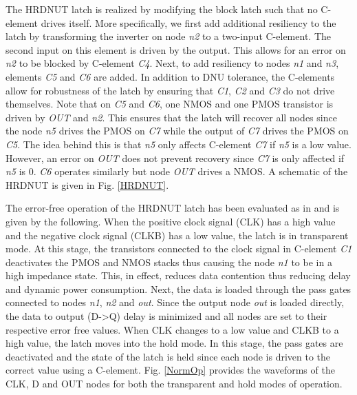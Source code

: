 The HRDNUT latch is realized by modifying the block latch such that no C-element drives itself. More specifically, we first add additional resiliency to the latch by transforming the inverter on node \textit{n2} to a two-input C-element. The second input on this element is driven by the output. This allows for an error on \textit{n2} to be blocked by C-element \textit{C4}. Next, to add resiliency to nodes \textit{n1} and \textit{n3}, elements \textit{C5} and \textit{C6} are added. In addition to DNU tolerance, the C-elements allow for robustness of the latch by ensuring that \textit{C1}, \textit{C2} and \textit{C3} do not drive themselves. Note that on \textit{C5} and \textit{C6}, one NMOS and one PMOS transistor is driven by \textit{OUT} and \textit{n2}. This ensures that the latch will recover all nodes since the node \textit{n5} drives the PMOS on \textit{C7} while the output of \textit{C7} drives the PMOS  on \textit{C5}. The idea behind this is that \textit{n5} only affects C-element \textit{C7} if \textit{n5} is a low value. However, an error on \textit{OUT} does not prevent recovery since \textit{C7} is only affected if \textit{n5} is 0. \textit{C6} operates similarly but node \textit{OUT} drives a NMOS. A schematic of the HRDNUT is given in Fig. \ref{HRDNUT}.

The error-free operation of the HRDNUT latch has been evaluated as in \cite{Watkins2016} and is given by the following. When the positive clock signal (CLK) has a high value and the negative clock signal (CLKB) has a low value, the latch is in transparent mode. At this stage, the transistors connected to the clock signal in C-element \textit{C1} deactivates the PMOS and NMOS stacks thus causing the node \textit{n1} to be in a high impedance state. This, in effect, reduces data contention thus reducing delay and dynamic power consumption. Next, the data is loaded through the pass gates connected to nodes \textit{n1}, \textit{n2} and \textit{out}. Since the output node \textit{out} is loaded directly, the data to output (D-\textgreater Q) delay is minimized and all nodes are set to their respective error free values. When CLK changes to a low value and CLKB to a high value, the latch moves into the hold mode. In this stage, the pass gates are deactivated and the state of the latch is held since each node is driven to the correct value using a C-element. Fig. \ref{NormOp} provides the waveforms of the CLK, D and OUT nodes for both the transparent and hold modes of operation.

